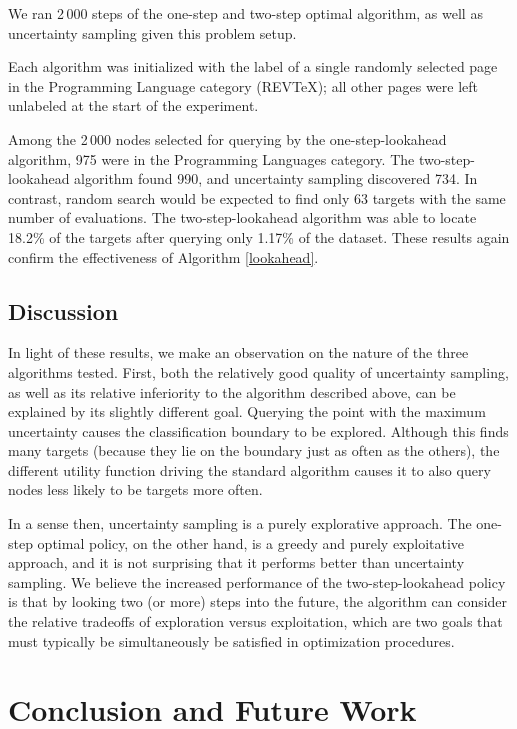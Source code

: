 \documentclass{acm_proc_article-sp}
\begin{document}
We ran 2\,000 steps of the one-step and two-step optimal algorithm, as
well as uncertainty sampling given this problem setup.

Each algorithm was initialized with the label of a single randomly
selected page in the Programming Language category (REV\TeX); all
other pages were left unlabeled at the start of the experiment.

Among the 2\,000 nodes selected for querying by the one-step-lookahead
algorithm, 975 were in the Programming Languages category.  The
two-step-lookahead algorithm found 990, and uncertainty sampling
discovered 734. In contrast, random search would be expected to find
only 63 targets with the same number of evaluations.  The
two-step-lookahead algorithm was able to locate 18.2\% of the targets
after querying only 1.17\% of the dataset.  These results again
confirm the effectiveness of Algorithm \ref{lookahead}.

\subsection{Discussion}

In light of these results, we make an observation on the nature of the
three algorithms tested.  First, both the relatively good quality of
uncertainty sampling, as well as its relative inferiority to the
algorithm described above, can be explained by its slightly different
goal.  Querying the point with the maximum uncertainty causes the
classification boundary to be explored.  Although this finds many
targets (because they lie on the boundary just as often as the
others), the different utility function driving the standard algorithm
causes it to also query nodes less likely to be targets more often.

In a sense then, uncertainty sampling is a purely explorative
approach.  The one-step optimal policy, on the other hand, is a greedy
and purely exploitative approach, and it is not surprising that it
performs better than uncertainty sampling.  We believe the increased
performance of the two-step-lookahead policy is that by looking two
(or more) steps into the future, the algorithm can consider the
relative tradeoffs of exploration versus exploitation, which are two
goals that must typically be simultaneously be satisfied in
optimization procedures.

\section{Conclusion and Future Work}
\end{document}
